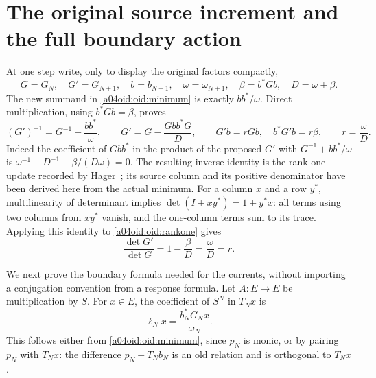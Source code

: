 \section{The original source increment and the full boundary action}

At one step write, only to display the original factors compactly,
\[
 G=G_N,\quad G'=G_{N+1},\quad b=b_{N+1},\quad
 \omega=\omega_{N+1},\quad \beta=b^*Gb,\quad D=\omega+\beta.
\]
The new summand in \eqref{a04oid:oid:minimum} is exactly $bb^*/\omega$.
Direct multiplication, using $b^*Gb=\beta$, proves
\begin{equation}\label{a04oid:oid:rankone}
 (G')^{-1}=G^{-1}+\frac{bb^*}{\omega},\qquad
 G'=G-\frac{Gbb^*G}{D},\qquad
 G'b=rGb,\quad b^*G'b=r\beta,
 \qquad r=\frac{\omega}{D}.
\end{equation}
Indeed the coefficient of $Gbb^*$ in the product of the proposed
$G'$ with $G^{-1}+bb^*/\omega$ is
$\omega^{-1}-D^{-1}-\beta/(D\omega)=0$.
The resulting inverse identity is the rank-one update recorded by
Hager~\cite[p.~221, equation~(2)]{a04oid:Hager}; its source column and its
positive denominator have been derived here from the actual minimum.
For a column $x$ and a row $y^*$, multilinearity of determinant
implies $\det(I+xy^*)=1+y^*x$: all terms using two columns from
$xy^*$ vanish, and the one-column terms sum to its trace.
Applying this identity to \eqref{a04oid:oid:rankone} gives
\begin{equation}\label{a04oid:oid:r}
 \frac{\det G'}{\det G}=1-\frac\beta D
 =\frac\omega D=r.
\end{equation}

We next prove the boundary formula needed for the currents, without
importing a conjugation convention from a response formula. Let $A:E\to E$
be multiplication by $S$. For $x\in E$, the coefficient of $S^N$ in
$T_Nx$ is
\begin{equation}\label{a04oid:oid:leading}
 \ell_Nx=\frac{b_N^*G_Nx}{\omega_N}.
\end{equation}
This follows either from \eqref{a04oid:oid:minimum}, since $p_N$ is monic,
or by pairing $p_N$ with $T_Nx$: the difference $p_N-T_Nb_N$
is an old relation and is orthogonal to $T_Nx$.


